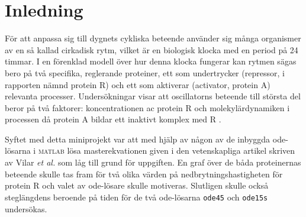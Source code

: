 \section{Inledning}
För att anpassa sig till dygnets cykliska beteende använder sig många organismer av en så kallad cirkadisk rytm, vilket är en biologisk klocka med en period på 24 timmar. I en förenklad modell över hur denna klocka fungerar kan rytmen sägas bero på två specifika, reglerande proteiner, ett som undertrycker (repressor, i rapporten nämnd protein R) och ett som aktiverar (activator, protein A) relevanta processer. Undersökningar visar att oscillatorns beteende till största del beror på två faktorer: koncentrationen ac protein R och molekylärdynamiken i processen då protein A bildar ett inaktivt komplex med R \cite{ref:rapport}.

Syftet med detta miniprojekt var att med hjälp av någon av de inbyggda ode-lösarna i \textsc{matlab} lösa masterekvationen given i den vetenskapliga artikel skriven av Vilar \emph{et al.} som låg till grund för uppgiften. En graf över de båda proteinernas beteende skulle tas fram för två olika värden på nedbrytningshastigheten för protein R och valet av ode-lösare skulle motiveras. Slutligen skulle också steglängdens beroende på tiden för de två ode-lösarna \texttt{ode45} och \texttt{ode15s} undersökas.